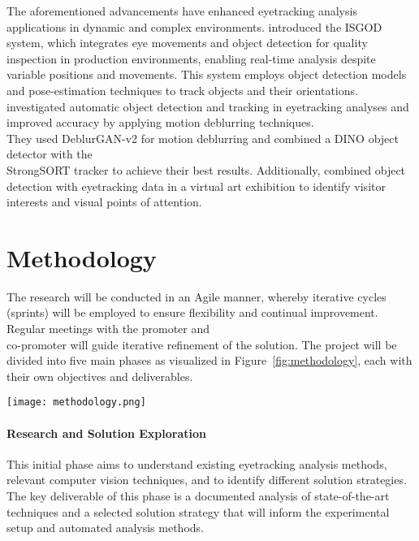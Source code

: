 \documentclass[english]{hogent-article}
\begin{document}
The aforementioned advancements have enhanced eyetracking analysis applications in dynamic and complex environments.
\textcite{Cho2024} introduced the ISGOD system, which integrates eye movements and object detection for quality inspection in production 
environments, enabling real-time analysis despite variable positions and movements. 
This system employs object detection models and pose-estimation techniques to track objects and their orientations.\\
\textcite{Cederin2023} investigated automatic object detection and tracking in eyetracking analyses and improved accuracy by applying motion deblurring techniques.\\ 
They used DeblurGAN-v2 for motion deblurring and combined a DINO object detector with the\\ StrongSORT tracker to achieve their best results.
Additionally, \textcite{Kulyk2023} combined object detection with eyetracking data in a virtual art exhibition to identify visitor interests and visual points of attention.

\section{Methodology}
\label{sec:methodology}

The research will be conducted in an Agile manner, whereby iterative cycles (sprints) will be employed 
to ensure flexibility and continual improvement.
Regular meetings with the promoter and\\ co-promoter will guide iterative refinement of the solution.
The project will be divided into five main phases as visualized in Figure~\ref{fig:methodology}, each with their own objectives and deliverables.

\begin{figure*}
  \centering
  \texttt{[image: methodology.png]}
  \caption{Overview of the project phases, their deliverables, and the relationships between them.}
  \label{fig:methodology}
\end{figure*}

\paragraph{Research and Solution Exploration\\}
This initial phase aims to understand existing eyetracking analysis methods, 
relevant computer vision techniques, and to identify different solution strategies. 
The key deliverable of this phase is a documented analysis of state-of-the-art techniques and a selected solution strategy 
that will inform the experimental setup and automated analysis methods.
\end{document}
